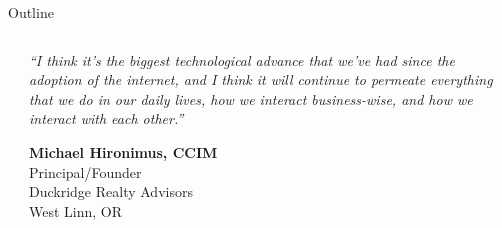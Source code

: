 \documentclass{beamer}
\begin{document}
\begin{frame}{Outline}
    \begin{columns}[c]
        \begin{column}{0.45\textwidth}
            \centering
            \large
            \setlength{\itemsep}{1em}
            \tableofcontents
        \end{column}
        \begin{column}{0.45\textwidth}
            \centering
            \begin{block}{}
                \normalsize
                \textit{``I think it's the biggest technological advance that we've had since the adoption of the internet, and I think it will continue to permeate everything that we do in our daily lives, how we interact business-wise, and how we interact with each other.''}
                
                \vspace{0.5em}
                \raggedleft
                \textbf{Michael Hironimus, CCIM}\\
                \small Principal/Founder\\
                Duckridge Realty Advisors\\
                West Linn, OR
            \end{block}
        \end{column}
    \end{columns}
\end{frame}
\end{document}
